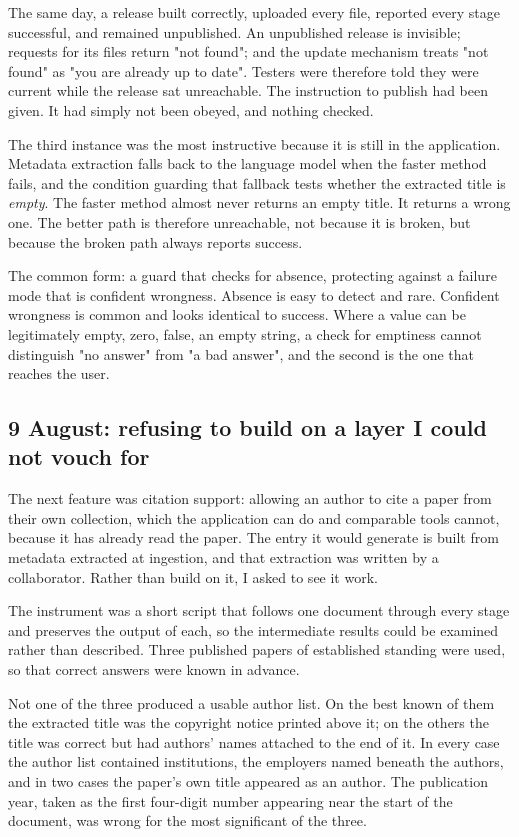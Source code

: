 \documentclass[11pt,a4paper]{article}
\begin{document}
The same day, a release built correctly, uploaded every file, reported every
stage successful, and remained unpublished. An unpublished release is invisible;
requests for its files return "not found"; and the update mechanism treats "not
found" as "you are already up to date". Testers were therefore told they were
current while the release sat unreachable. The instruction to publish had been
given. It had simply not been obeyed, and nothing checked.

The third instance was the most instructive because it is still in the
application. Metadata extraction falls back to the language model when the
faster method fails, and the condition guarding that fallback tests whether the
extracted title is \emph{empty}. The faster method almost never returns an empty
title. It returns a wrong one. The better path is therefore unreachable, not
because it is broken, but because the broken path always reports success.

The common form: a guard that checks for absence, protecting against a failure
mode that is confident wrongness. Absence is easy to detect and rare. Confident
wrongness is common and looks identical to success. Where a value can be
legitimately empty, zero, false, an empty string, a check for emptiness
cannot distinguish "no answer" from "a bad answer", and the second is the one
that reaches the user.

\subsection{9 August: refusing to build on a layer I could not vouch for}

The next feature was citation support: allowing an author to cite a paper from
their own collection, which the application can do and comparable tools cannot,
because it has already read the paper. The entry it would generate is built from
metadata extracted at ingestion, and that extraction was written by a
collaborator. Rather than build on it, I asked to see it work.

The instrument was a short script that follows one document through every stage
and preserves the output of each, so the intermediate results could be examined
rather than described. Three published papers of established standing were used,
so that correct answers were known in advance.

Not one of the three produced a usable author list. On the best known of them
the extracted title was the copyright notice printed above it; on the others the
title was correct but had authors' names attached to the end of it. In every
case the author list contained institutions, the employers named beneath the
authors, and in two cases the paper's own title appeared as an author. The
publication year, taken as the first four-digit number appearing near the start
of the document, was wrong for the most significant of the three.
\end{document}
